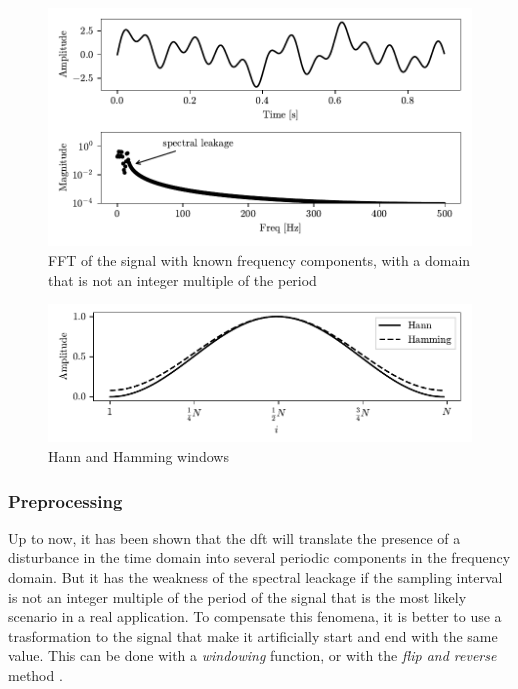 \begin{figure}
    \centering
    \includegraphics[scale=1]{images/FeatureExtraction/FD_known_outofsync.pdf}
    \caption{FFT of the signal with known frequency components, with a domain that is not an integer multiple of the period}
    \label{fig:FD_known_leackage}
\end{figure}

\begin{figure}
    \centering
    \includegraphics[scale=1]{images/FeatureExtraction/windows.pdf}
    \caption{Hann and Hamming windows}
    \label{fig:windows}
\end{figure} 


\subsubsection{Preprocessing}
Up to now, it has been shown that the \gls{dft} will translate the presence of a disturbance in the time domain into several periodic components in the frequency domain. But it has the weakness of the spectral leackage if the sampling interval is not an integer multiple of the period of the signal that is the most likely scenario in a real application. To compensate this fenomena, it is better to use a trasformation to the signal that make it artificially start and end with the same value. This can be done with a \emph{windowing} function, or with the \emph{flip and reverse} method \cite{Preprocessing}. 

